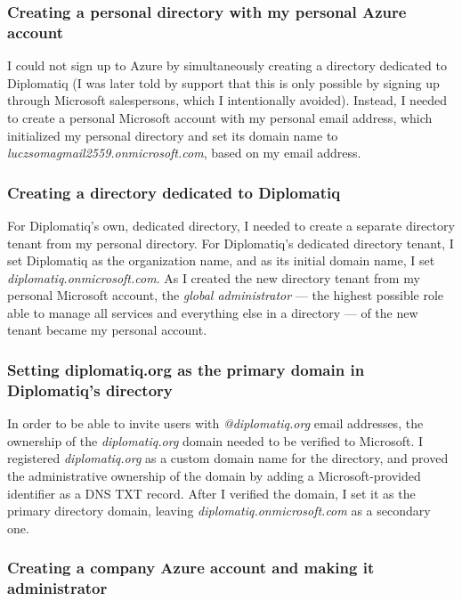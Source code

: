 \subsubsection{Creating a personal directory with my personal Azure account}

I could not sign up to Azure by simultaneously creating a directory dedicated to Diplomatiq (I was later told by support that this is only possible by signing up through Microsoft salespersons, which I intentionally avoided). Instead, I needed to create a personal Microsoft account with my personal email address, which initialized my personal directory and set its domain name to \emph{luczsomagmail2559.onmicrosoft.com}, based on my email address.

\subsubsection{Creating a directory dedicated to Diplomatiq}

For Diplomatiq's own, dedicated directory, I needed to create a separate directory tenant from my personal directory. For Diplomatiq's dedicated directory tenant, I set Diplomatiq as the organization name, and as its initial domain name, I set \emph{diplomatiq.onmicrosoft.com}. As I created the new directory tenant from my personal Microsoft account, the \emph{global administrator} — the highest possible role able to manage all services and everything else in a directory — of the new tenant became my personal account.

\subsubsection{Setting diplomatiq.org as the primary domain in Diplomatiq's directory}

In order to be able to invite users with \emph{@diplomatiq.org} email addresses, the ownership of the \emph{diplomatiq.org} domain needed to be verified to Microsoft. I registered \emph{diplomatiq.org} as a custom domain name for the directory, and proved the administrative ownership of the domain by adding a Microsoft-provided identifier as a DNS TXT record. After I verified the domain, I set it as the primary directory domain, leaving \emph{diplomatiq.onmicrosoft.com} as a secondary one.

\subsubsection{Creating a company Azure account and making it administrator}

